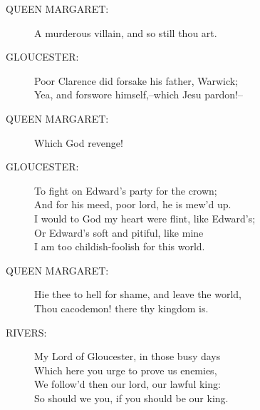 \documentclass{article}
\begin{document}
\begin{description}
\item[QUEEN MARGARET:] 
\hspace{1pt}A murderous villain, and so still thou art.\\
\end{description}
\begin{description}
\item[GLOUCESTER:] 
\hspace{1pt}Poor Clarence did forsake his father, Warwick;\\
\hspace{1pt}Yea, and forswore himself,--which Jesu pardon!--\\
\end{description}
\begin{description}
\item[QUEEN MARGARET:] 
\hspace{1pt}Which God revenge!\\
\end{description}
\begin{description}
\item[GLOUCESTER:] 
\hspace{1pt}To fight on Edward's party for the crown;\\
\hspace{1pt}And for his meed, poor lord, he is mew'd up.\\
\hspace{1pt}I would to God my heart were flint, like Edward's;\\
\hspace{1pt}Or Edward's soft and pitiful, like mine\\
\hspace{1pt}I am too childish-foolish for this world.\\
\end{description}
\begin{description}
\item[QUEEN MARGARET:] 
\hspace{1pt}Hie thee to hell for shame, and leave the world,\\
\hspace{1pt}Thou cacodemon! there thy kingdom is.\\
\end{description}
\begin{description}
\item[RIVERS:] 
\hspace{1pt}My Lord of Gloucester, in those busy days\\
\hspace{1pt}Which here you urge to prove us enemies,\\
\hspace{1pt}We follow'd then our lord, our lawful king:\\
\hspace{1pt}So should we you, if you should be our king.\\
\end{description}
\end{document}
